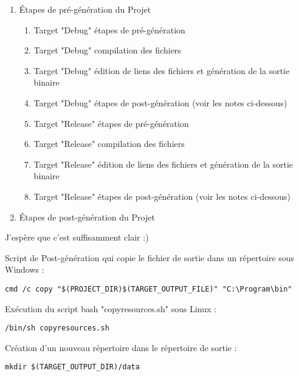 \begin{enumerate}
\item Étapes de pré-génération du Projet
    \begin{enumerate}
    \item Target "Debug" étapes de pré-génération
    \item Target "Debug" compilation des fichiers
    \item Target "Debug" édition de liens des fichiers et génération de la sortie binaire
    \item Target "Debug" étapes de post-génération (voir les notes ci-dessous)
    \item Target "Release" étapes de pré-génération
    \item Target "Release" compilation des fichiers
    \item Target "Release" édition de liens des fichiers et génération de la sortie binaire
    \item Target "Release" étapes de post-génération (voir les notes ci-dessous)
    \end{enumerate}
\item Étapes de post-génération du Projet
\end{enumerate}

J'espère que c'est suffisamment clair :)



Script de Post-génération qui copie le fichier de sortie dans un répertoire  sous Windows : 

\begin{lstlisting}
cmd /c copy "$(PROJECT_DIR)$(TARGET_OUTPUT_FILE)" "C:\Program\bin"
\end{lstlisting}

Exécution du script bash "copyresources.sh" sous Linux :

\begin{lstlisting}
/bin/sh copyresources.sh
\end{lstlisting}

Création d'un nouveau répertoire dans le répertoire de sortie :

\begin{lstlisting}
mkdir $(TARGET_OUTPUT_DIR)/data
\end{lstlisting}  
